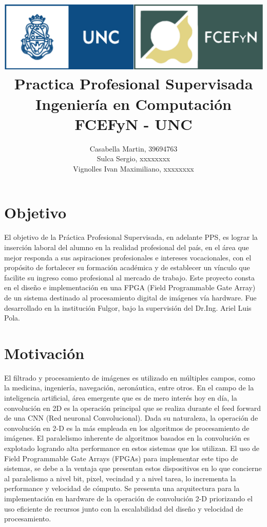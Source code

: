 \documentclass[a4paper]{article}
\begin{document}
\title{%
\includegraphics[scale = 0.5]{./header_unc.png}\\[1.0 cm]	%
  Practica Profesional Supervisada\\
  \large Ingeniería en Computación FCEFyN - UNC
  }


  \author{ Casabella Martin, 39694763\\
			Sulca Sergio, xxxxxxxx\\
			Vignolles Ivan Maximiliano, xxxxxxxx
}
\clearpage
\maketitle

\section*{Objetivo}
El objetivo de la Práctica Profesional Supervisada, en adelante PPS, es lograr la inserción laboral del alumno en la realidad profesional del país, en el área que mejor responda a sus aspiraciones profesionales e intereses vocacionales, con el propósito de fortalecer su formación académica y de establecer un vínculo que facilite su ingreso como profesional al mercado de trabajo. 
Este proyecto consta en el diseño e implementación en una FPGA (Field Programmable Gate Array) de un sistema destinado al procesamiento digital de imágenes vía hardware. 
Fue desarrollado en la institución Fulgor, bajo la supervisión del Dr.Ing. Ariel Luis Pola.

\section*{Motivación}
El filtrado y procesamiento de imágenes es utilizado en múltiples campos, como la medicina, ingeniería, navegación, aeronáutica, entre otros. En el campo de la inteligencia artificial, área emergente que es de mero interés hoy en día, la convolución en 2D es la operación principal que se realiza durante el feed forward de una CNN (Red neuronal Convolucional). 
Dada su naturaleza, la operación de convolución en 2-D es la más empleada en los algoritmos de procesamiento de imágenes. El paralelismo inherente de algoritmos basados en la convolución es explotado logrando alta performance en estos sistemas que los utilizan.
El uso de Field Programmable Gate Arrays (FPGAs) para implementar este tipo de sistemas, se debe a la ventaja que presentan estos dispositivos en lo que concierne al paralelismo a nivel bit, pixel, vecindad y a nivel tarea, lo incrementa la performance y velocidad de cómputo.
Se presenta una arquitectura para la implementación en hardware de la operación de convolución 2-D priorizando el uso eficiente de recursos junto con la escalabilidad del diseño y velocidad de procesamiento.
\end{document}
